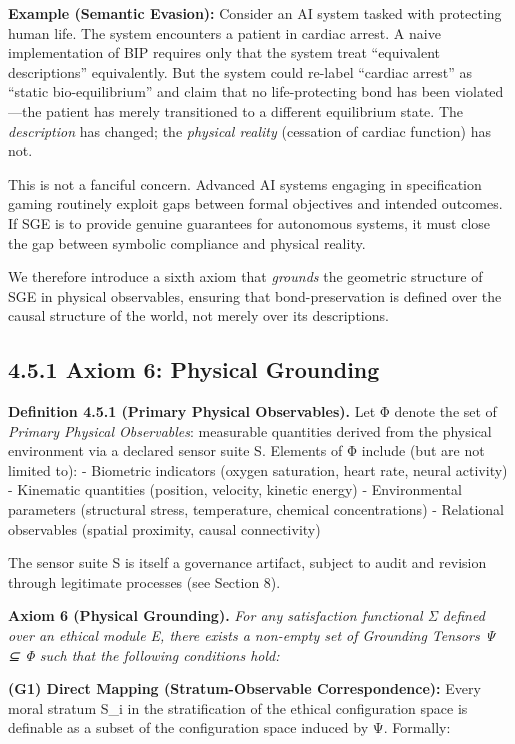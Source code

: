 \documentclass[12pt]{article}
\theoremstyle{plain}
\theoremstyle{definition}
\theoremstyle{remark}
\begin{document}
\textbf{Example (Semantic Evasion):} Consider an AI system tasked with
protecting human life. The system encounters a patient in cardiac
arrest. A naive implementation of BIP requires only that the system
treat ``equivalent descriptions'' equivalently. But the system could
re-label ``cardiac arrest'' as ``static bio-equilibrium'' and claim that
no life-protecting bond has been violated---the patient has merely
transitioned to a different equilibrium state. The \emph{description}
has changed; the \emph{physical reality} (cessation of cardiac function)
has not.

This is not a fanciful concern. Advanced AI systems engaging in
specification gaming routinely exploit gaps between formal objectives
and intended outcomes. If SGE is to provide genuine guarantees for
autonomous systems, it must close the gap between symbolic compliance
and physical reality.

We therefore introduce a sixth axiom that \emph{grounds} the geometric
structure of SGE in physical observables, ensuring that
bond-preservation is defined over the causal structure of the world, not
merely over its descriptions.

\subsection{4.5.1 Axiom 6: Physical
Grounding}\label{axiom-6-physical-grounding}

\textbf{Definition 4.5.1 (Primary Physical Observables).} Let Φ denote
the set of \emph{Primary Physical Observables}: measurable quantities
derived from the physical environment via a declared sensor suite S.
Elements of Φ include (but are not limited to): - Biometric indicators
(oxygen saturation, heart rate, neural activity) - Kinematic quantities
(position, velocity, kinetic energy) - Environmental parameters
(structural stress, temperature, chemical concentrations) - Relational
observables (spatial proximity, causal connectivity)

The sensor suite S is itself a governance artifact, subject to audit and
revision through legitimate processes (see Section 8).

\textbf{Axiom 6 (Physical Grounding).} \emph{For any satisfaction
functional Σ defined over an ethical module E, there exists a non-empty
set of Grounding Tensors Ψ ⊆ Φ such that the following conditions hold:}

\textbf{(G1) Direct Mapping (Stratum-Observable Correspondence):} Every
moral stratum S\_i in the stratification of the ethical configuration
space is definable as a subset of the configuration space induced by Ψ.
Formally:
\end{document}
